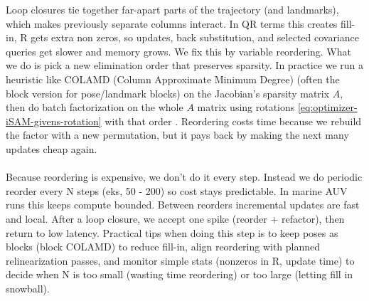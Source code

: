 Loop closures tie together far-apart parts of the trajectory (and landmarks), which makes previously separate columns interact. In QR terms this creates fill-in, R gets extra non zeros, so updates, back substitution, and selected covariance queries get slower and memory grows. We fix this by variable reordering. What we do is pick a new elimination order that preserves sparsity. In practice we run a heuristic like COLAMD (Column Approximate Minimum Degree) (often the block version for pose/landmark blocks) on the Jacobian's sparsity matrix $A$, then do batch factorization on the whole $A$ matrix using rotations \eqref{eq:optimizer-iSAM-givens-rotation} with that order \cite{iSAM_paper}. Reordering costs time because we rebuild the factor with a new permutation, but it pays back by making the next many updates cheap again.
\\ \\
Because reordering is expensive, we don't do it every step. Instead we do periodic reorder every N steps (eks, 50 - 200) so cost stays predictable. In marine AUV runs this keeps compute bounded. Between reorders incremental updates are fast and local. After a loop closure, we accept one spike (reorder + refactor), then return to low latency. Practical tips when doing this step is to keep poses as blocks (block COLAMD) to reduce fill-in, align reordering with planned relinearization passes, and monitor simple stats (nonzeros in R, update time) to decide when N is too small (wasting time reordering) or too large (letting fill in snowball).  



